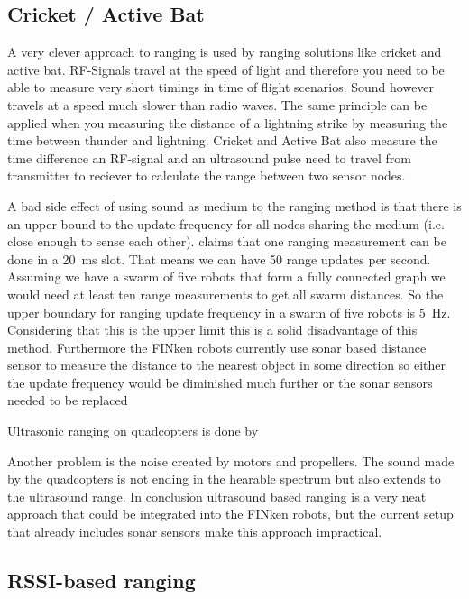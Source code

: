 \subsection{Cricket / Active Bat}
A very clever approach to ranging is used by ranging solutions like cricket\cite{cricket_01} and active bat\cite{active_bat}. 
RF-Signals travel at the speed of light and therefore you need to be able to measure very short timings in time of flight scenarios.
Sound however travels at a speed much slower than radio waves.
The same principle can be applied when you measuring the distance of a lightning strike by measuring the time between thunder and lightning.
Cricket and Active Bat also measure the time difference an RF-signal and an ultrasound pulse need to travel from transmitter to reciever to calculate the range between two sensor nodes.

A bad side effect of using sound as medium to the ranging method is that there is an upper bound to the update frequency for all nodes sharing the medium (i.e. close enough to sense each other). \cite{active_bat} claims that one ranging measurement can be done in a \SI{20}{\milli\second} slot.
That means we can have 50 range updates per second. Assuming we have a swarm of five robots that form a fully connected graph we would need at least ten range measurements to get all swarm distances.
So the upper boundary for ranging update frequency in a swarm of five robots is \SI{5}{\hertz}.
Considering that this is the upper limit this is a solid disadvantage of this method.
Furthermore the FINken robots currently use sonar based distance sensor to measure the distance to the nearest object in some direction so either the update frequency would be diminished much further or the sonar sensors needed to be replaced

Ultrasonic ranging on quadcopters is done by \cite{ultrasonic_erlangen}

Another problem is the noise created by motors and propellers.
The sound made by the quadcopters is not ending in the hearable spectrum but also extends to the ultrasound range.
In conclusion ultrasound based ranging is a very neat approach that could be integrated into the FINken robots, but the current setup that already includes sonar sensors make this approach impractical.

\subsection{RSSI-based ranging}

